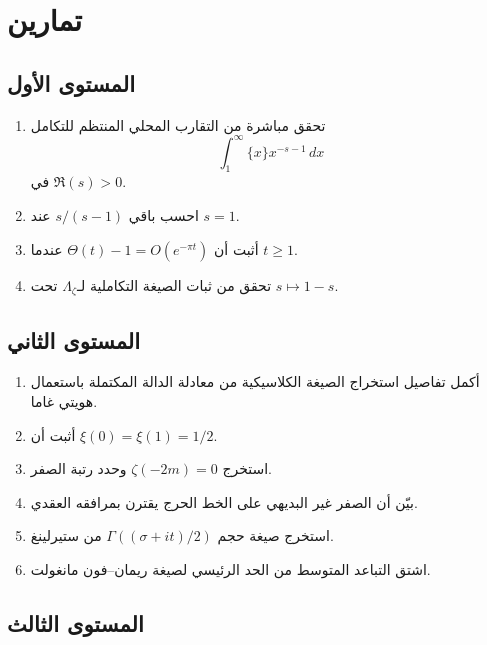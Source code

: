 \section{تمارين}

\subsection{المستوى الأول}

\begin{enumerate}
  \item تحقق مباشرة من التقارب المحلي المنتظم للتكامل
  \[
  \int_1^\infty\{x\}x^{-s-1}\,dx
  \]
  في \(\Re(s)>0\).
  \item احسب باقي \(s/(s-1)\) عند \(s=1\).
  \item أثبت أن \(\Theta(t)-1=O(e^{-\pi t})\) عندما \(t\geq1\).
  \item تحقق من ثبات الصيغة التكاملية لـ\(\Lambda_\zeta\) تحت
  \(s\mapsto1-s\).
\end{enumerate}

\subsection{المستوى الثاني}

\begin{enumerate}
  \item أكمل تفاصيل استخراج الصيغة الكلاسيكية من معادلة الدالة المكتملة
  باستعمال هويتي غاما.
  \item أثبت أن \(\xi(0)=\xi(1)=1/2\).
  \item استخرج \(\zeta(-2m)=0\) وحدد رتبة الصفر.
  \item بيّن أن الصفر غير البديهي على الخط الحرج يقترن بمرافقه العقدي.
  \item استخرج صيغة حجم \(\Gamma((\sigma+it)/2)\) من ستيرلينغ.
  \item اشتق التباعد المتوسط من الحد الرئيسي لصيغة ريمان--فون مانغولت.
\end{enumerate}

\subsection{المستوى الثالث}


